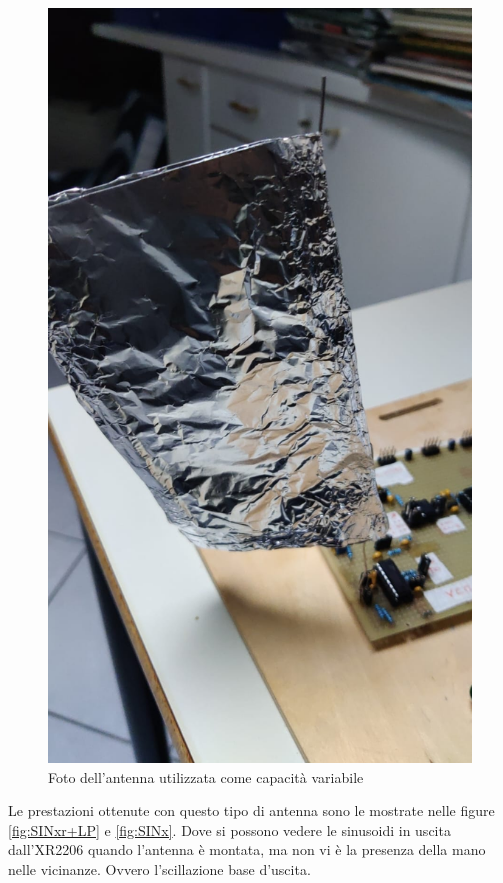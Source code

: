 \documentclass[titlepage]{report}
\begin{document}
	\begin{figure}[H]
		\centering
		\includegraphics[scale=0.25]{Immagini/Antenna.jpg}
		\caption{Foto dell'antenna utilizzata come capacità variabile}
		\label{fig:antenna}
	\end{figure}
	
	Le prestazioni ottenute con questo tipo di antenna sono le mostrate nelle figure \ref{fig:SINxr+LP} e \ref{fig:SINx}. Dove si possono vedere le sinusoidi in uscita dall'XR2206 quando l'antenna è montata, ma non vi è la presenza della mano nelle vicinanze. Ovvero l'scillazione base d'uscita.
	
\end{document}
